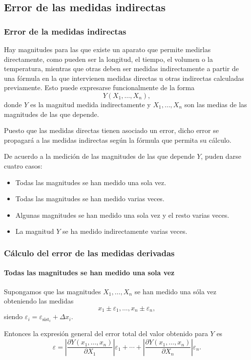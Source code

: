 \subsection{Error de las medidas indirectas}
\begin{frame}
	\frametitle{Error de la medidas indirectas}
	Hay magnitudes para las que existe un aparato que permite medirlas directamente, como pueden ser la longitud, el
	tiempo, el volumen o la temperatura, mientras que otras deben ser medidas indirectamente a partir de una fórmula en la
	que intervienen medidas directas u otras indirectas calculadas previamente. Esto puede expresarse funcionalmente de la forma
	\[Y(X_1,\ldots,X_n),\]
	donde $Y$ es la magnitud medida indirectamente y $X_1,\ldots,X_n$ son las medias de las magnitudes de las que depende. 
	
	Puesto que las medidas directas tienen asociado un error, dicho error se propagará a las medidas indirectas según la
	fórmula que permita su cálculo.
	
	De acuerdo a la medición de las magnitudes de las que depende $Y$, puden darse cuatro casos:
	\begin{itemize}
		\item Todas las magnitudes se han medido una sola vez.
		\item Todas las magnitudes se han medido varias veces.
		\item Algunas magnitudes se han medido una sola vez y el resto varias veces.
		\item La magnitud $Y$ se ha medido indirectamente varias veces.
	\end{itemize}
\end{frame}


\begin{frame}
	\frametitle{Cálculo del error de las medidas derivadas}
	\framesubtitle{Todas las magnitudes se han medido una sola vez}
	Supongamos que las magnitudes $X_1,\ldots,X_n$ se han medido una sóla vez obteniendo las medidas
	\[
		x_1\pm \varepsilon_1,\ldots, x_n\pm\varepsilon_n,
	\] 
	siendo $\varepsilon_i=\varepsilon_{\textrm{sist}_i}+\Delta x_i$.
	
	Entonces la expresión general del error total del valor obtenido para $Y$ es
	\[
		\varepsilon=\left|\frac{\partial Y(x_1,\ldots,x_n)}{\partial X_1}\right|\varepsilon_1+\cdots+\left|\frac{\partial
			Y(x_1,\ldots,x_n)}{\partial X_n}\right|\varepsilon_n.
	\]
\end{frame}



